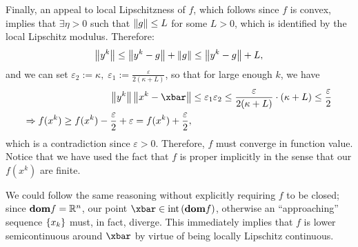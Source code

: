 \documentclass[10pt]{article}
\newcommand{\eps}{\varepsilon}
\begin{document}
\begin{Answer}
	Finally, an appeal to local Lipschitzness of $f$, which follows since $f$ is
	convex, implies that $\exists \eta > 0$ such that $ \leq L$ for
	some $L > 0$, which is identified by the local Lipschitz modulus.
	Therefore:
	\[
		\left \| y^k \right \| \leq \left \| y^k - g \right \| + \left \| g \right \| \leq \left \| y^k - g \right \| + L,
	\]
	and we can set $\eps_2 := \kappa, \; \eps_1 := \frac{\eps}{2 (\kappa + L)}$,
	so that for large enough $k$, we have
	\begin{align*}
		\norm{y^k} \norm{x^k - \xbar} &\leq \eps_1 \eps_2 \leq
		\frac{\eps}{2 (\kappa + L)} \cdot (\kappa + L) \leq \frac{\eps}{2} \\
		\Rightarrow f(x^k) \geq f(x^k) - \frac{\eps}{2} + \eps = f(x^k) +
		\frac{\eps}{2},
	\end{align*}
	which is a contradiction since $\eps > 0$. Therefore, $f$ must converge in
	function value. Notice that we have used the fact that $f$ is proper
	implicitly in the sense that our $f(x^k)$ are finite.

	We could follow the same reasoning without explicitly requiring $f$ to be
	closed; since $\dom f = \Rbb^n$, our point $\xbar \in {}$, otherwise an
	``approaching'' sequence $$ must, in fact, diverge. This
	immediately implies that $f$ is lower semicontinuous around $\xbar$ by
	virtue of being locally Lipschitz continuous.
\end{Answer}
\end{document}
